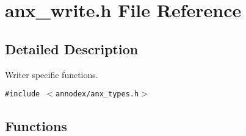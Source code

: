 \section{anx\_\-write.h File Reference}
\label{anx__write_8h}


\subsection{Detailed Description}
Writer specific functions. 



{\tt \#include $<$annodex/anx\_\-types.h$>$}\par
\subsection*{Functions}

